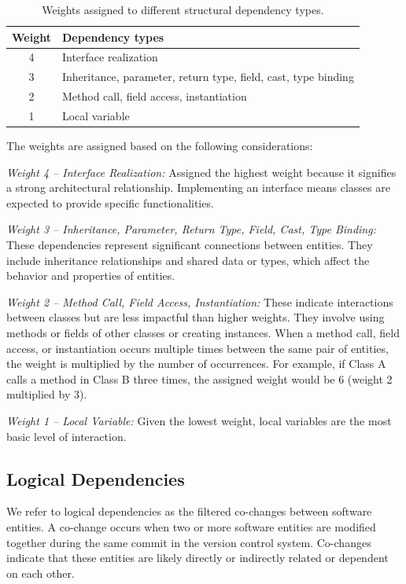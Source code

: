 \documentclass{ieeeaccess}
\begin{document}
\begin{table}[htbp]
\centering
\begin{tabular}{|c|l|}
\hline
\textbf{Weight} & \textbf{Dependency types} \\
\hline
4 & Interface realization \\
3 & Inheritance, parameter, return type, field, cast, type binding \\
2 & Method call, field access, instantiation \\
1 & Local variable \\
\hline
\end{tabular}
\caption{Weights assigned to different structural dependency types. \cite{b20}}
\label{tab:structural_weights}
\end{table}

The weights are assigned based on the following considerations:

\textit{Weight 4 – Interface Realization:} Assigned the highest weight because it signifies a strong architectural relationship. Implementing an interface means classes are expected to provide specific functionalities.

\textit{Weight 3 – Inheritance, Parameter, Return Type, Field, Cast, Type Binding:} These dependencies represent significant connections between entities. They include inheritance relationships and shared data or types, which affect the behavior and properties of entities.

\textit{Weight 2 – Method Call, Field Access, Instantiation:} These indicate interactions between classes but are less impactful than higher weights. They involve using methods or fields of other classes or creating instances. When a method call, field access, or instantiation occurs multiple times between the same pair of entities, the weight is multiplied by the number of occurrences. For example, if Class A calls a method in Class B three times, the assigned weight would be 6 (weight 2 multiplied by 3).

\textit{Weight 1 – Local Variable:} Given the lowest weight, local variables are the most basic level of interaction.



\subsection{Logical Dependencies}
\label{subsec:ld}

We refer to logical dependencies as the filtered co-changes between software entities. A co-change occurs when two or more software entities are modified together during the same commit in the version control system. Co-changes indicate that these entities are likely directly or indirectly related or dependent on each other.
\end{document}
